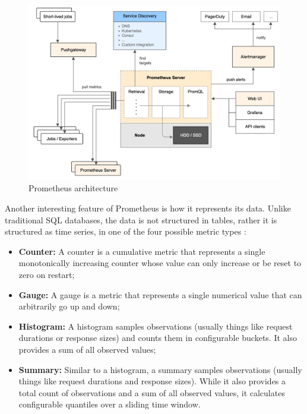 \begin{figure}
    \centering
    \includegraphics[width=\textwidth]{gfx/prometheus_architecture.png}
    \caption[Prometheus architecture]{Prometheus architecture\footnotemark}
    \label{fig:prometheus_architecture}
\end{figure}


Another interesting feature of Prometheus is how it represents its data. Unlike traditional SQL databases, the data is not structured in tables, rather it is structured as time series, in one of the four possible metric types \cite{prometheus_metrics}:
\begin{itemize}
    \item \textbf{Counter: }A counter is a cumulative metric that represents a single monotonically increasing counter whose value can only increase or be reset to zero on restart;
    \item \textbf{Gauge: }A gauge is a metric that represents a single numerical value that can arbitrarily go up and down;
    \item \textbf{Histogram: }A histogram samples observations (usually things like request durations or response sizes) and counts them in configurable buckets. It also provides a sum of all observed values;
    \item \textbf{Summary: }Similar to a histogram, a summary samples observations (usually things like request durations and response sizes). While it also provides a total count of observations and a sum of all observed values, it calculates configurable quantiles over a sliding time window.
\end{itemize}

